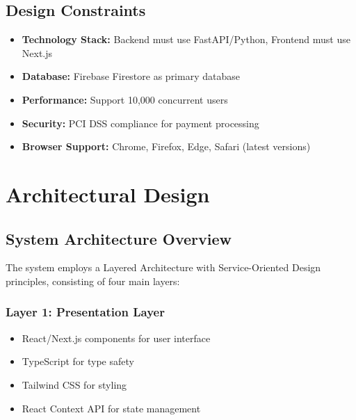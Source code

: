\documentclass[12pt,a4paper]{article}
\begin{document}
\subsection{Design Constraints}
\begin{itemize}
    \item \textbf{Technology Stack:} Backend must use FastAPI/Python, Frontend must use Next.js
    \item \textbf{Database:} Firebase Firestore as primary database
    \item \textbf{Performance:} Support 10,000 concurrent users
    \item \textbf{Security:} PCI DSS compliance for payment processing
    \item \textbf{Browser Support:} Chrome, Firefox, Edge, Safari (latest versions)
\end{itemize}

\newpage

\section{Architectural Design}

\subsection{System Architecture Overview}
The system employs a Layered Architecture with Service-Oriented Design principles, consisting of four main layers:

\subsubsection{Layer 1: Presentation Layer}
\begin{itemize}
    \item React/Next.js components for user interface
    \item TypeScript for type safety
    \item Tailwind CSS for styling
    \item React Context API for state management
\end{itemize}
\end{document}
